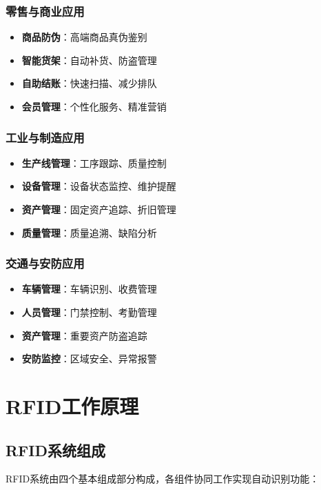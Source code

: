 \documentclass[12pt,UTF8]{ctexbook}
\begin{document}
\subsection{零售与商业应用}
\begin{itemize}[leftmargin=3.5em]
    \item \textbf{商品防伪}：高端商品真伪鉴别
    \item \textbf{智能货架}：自动补货、防盗管理
    \item \textbf{自助结账}：快速扫描、减少排队
    \item \textbf{会员管理}：个性化服务、精准营销
\end{itemize}

\subsection{工业与制造应用}
\begin{itemize}[leftmargin=3.5em]
    \item \textbf{生产线管理}：工序跟踪、质量控制
    \item \textbf{设备管理}：设备状态监控、维护提醒
    \item \textbf{资产管理}：固定资产追踪、折旧管理
    \item \textbf{质量管理}：质量追溯、缺陷分析
\end{itemize}

\subsection{交通与安防应用}
\begin{itemize}[leftmargin=3.5em]
    \item \textbf{车辆管理}：车辆识别、收费管理
    \item \textbf{人员管理}：门禁控制、考勤管理
    \item \textbf{资产管理}：重要资产防盗追踪
    \item \textbf{安防监控}：区域安全、异常报警
\end{itemize}

\chapter{RFID工作原理}

\section{RFID系统组成}

RFID系统由四个基本组成部分构成，各组件协同工作实现自动识别功能：
\end{document}
